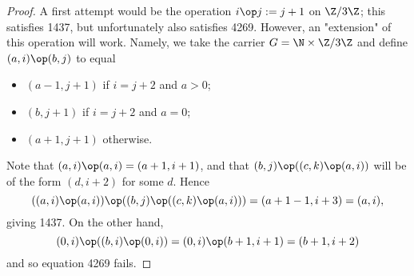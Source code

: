 \begin{proof} A first attempt would be the operation $i \op j := j+1$ on $\Z/3\Z$; this satisfies 1437, but unfortunately also satisfies 4269.  However, an "extension" of this operation will work. Namely, we take the carrier $G = \N \times \Z/3\Z$ and define $(a,i) \op (b,j)$ to equal
  \begin{itemize}
    \item $(a-1,j+1)$ if $i=j+2$ and $a>0$;
    \item $(b,j+1)$ if $i=j+2$ and $a=0$;
    \item $(a+1,j+1)$ otherwise.
  \end{itemize}
Note that $(a,i) \op (a,i) = (a+1,i+1)$, and that $(b,j) \op ((c,k) \op (a,i))$ will be of the form $(d,i+2)$ for some $d$.  Hence
$$ ((a,i) \op (a,i)) \op ((b,j) \op ((c,k) \op (a,i))) = (a+1-1, i+3) = (a,i),$$
giving 1437.  On the other hand,
$$ (0,i) \op ((b,i) \op (0,i)) = (0,i) \op (b+1,i+1) = (b+1,i+2)$$
and so equation 4269 fails.
\end{proof}
